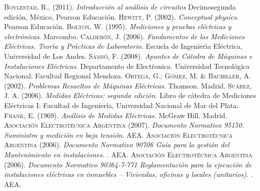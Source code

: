\begin{thebibliography}{X}
	 \textsc{Boylestad, R.}, (2011). \textit{Introducción al análisis de circuitos} Decimosegunda edición, México, Pearson Educación.
	 \textsc{Hewitt, P.} (2002). \textit{Conceptual physics}. Pearson Educación.
	 \textsc{Bolton, W.} (1995). \textit{Mediciones y pruebas eléctricas y electrónicas}. Marcombo.
	 \textsc{Calderón, J.} (2006). \textit{Fundamentos de las Mediciones Eléctricas. Teorı́a y Prácticas de Laboratorio}. Escuela de Ingenierı́a Eléctrica, Universidad de Los Andes.
	 \textsc{Samsó, F.} (2008). \textit{Apuntes de Cátedra de Máquinas e Instalaciones Eléctricas}. Departamento de Electŕonica. Universidad Tecnológica Nacional: Facultad Regional Mendoza.
	 \textsc{Ortega, G.; Gómez, M. \& Bachiller, A.} (2002). \textit{Problemas Resueltos de Máquinas Eléctricas}. Thomson. Madrid.
	 \textsc{Suárez, J. A.} (2006). \textit{Medidas Eléctricas: segunda edición}. Libro de cátedra de Mediciones Eléctricas I: Facultad de Ingeniería, Universidad Nacional de Mar del Plata.
	 \textsc{Frank, E.} (1969). \textit{Análisis de Medidas Eléctricas}. McGraw Hill. Madrid.
	 \textsc{Asociación Electrotécnica Argentina} (2007). \textit{Documento Normativo 95150. Suministro y medición en baja tensión}. AEA.
	 \textsc{Asociación Electrotécnica Argentina} (2006). \textit{Documento Normativo 90706 Guía para la gestión del Mantenimiento en instalaciones. }. AEA.
	 \textsc{Asociación Electrotécnica Argentina} (2006). \textit{Documento Normativo 90364-7-771 Reglamentación para la ejecución de instalaciones eléctricas en inmuebles – Viviendas, oficinas y locales (unitarios). }. AEA.
\end{thebibliography}